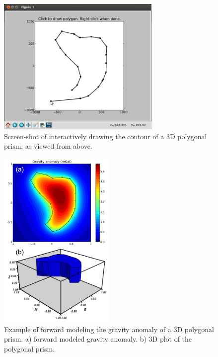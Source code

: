 \begin{figure}
    \centering
    \includegraphics[width=0.7\textwidth]{figures/paper1/forward_modeling_polyprism_drawing}
    \caption{
        Screen-shot of interactively drawing the contour of a 3D polygonal
        prism, as viewed from above.
    }
    \label{fig:drawing}
\end{figure}

\begin{figure}
    \centering
    \includegraphics[width=0.5\textwidth]{figures/paper1/forward_modeling_polyprism}
    \caption{
        Example of forward modeling the gravity anomaly of a 3D polygonal
        prism.
        a) forward modeled gravity anomaly.
        b) 3D plot of the polygonal prism.
    }
    \label{fig:polyprism}
\end{figure}




